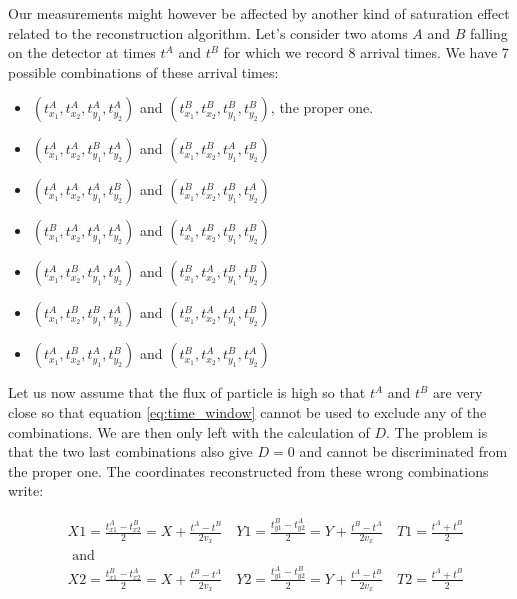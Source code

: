 Our measurements might however be affected by another kind of saturation effect related to the reconstruction algorithm. Let's consider two atoms $A$ and $B$ falling on the detector at times $t^A$ and $t^B$ for which we record 8 arrival times. We have 7 possible combinations of these arrival times:

\begin{itemize}
    \item $(t^A_{x_1},t^A_{x_2},t^A_{y_1},t^A_{y_2})$ and $(t^B_{x_1},t^B_{x_2},t^B_{y_1},t^B_{y_2})$, the proper one.
    
    \item $(t^A_{x_1},t^A_{x_2},t^B_{y_1},t^A_{y_2})$ and $(t^B_{x_1},t^B_{x_2},t^A_{y_1},t^B_{y_2})$
    
    \item $(t^A_{x_1},t^A_{x_2},t^A_{y_1},t^B_{y_2})$ and $(t^B_{x_1},t^B_{x_2},t^B_{y_1},t^A_{y_2})$
    
    \item $(t^B_{x_1},t^A_{x_2},t^A_{y_1},t^A_{y_2})$ and $(t^A_{x_1},t^B_{x_2},t^B_{y_1},t^B_{y_2})$
    
    \item $(t^A_{x_1},t^B_{x_2},t^A_{y_1},t^A_{y_2})$ and $(t^B_{x_1},t^A_{x_2},t^B_{y_1},t^B_{y_2})$
    
    \item $(t^A_{x_1},t^B_{x_2},t^B_{y_1},t^A_{y_2})$ and $(t^B_{x_1},t^A_{x_2},t^A_{y_1},t^B_{y_2})$
    
    \item $(t^A_{x_1},t^B_{x_2},t^A_{y_1},t^B_{y_2})$ and $(t^B_{x_1},t^A_{x_2},t^B_{y_1},t^A_{y_2})$
\end{itemize}

Let us now assume that the flux of particle is high so that $t^A$ and $t^B$ are very close so that equation \ref{eq:time_window} cannot be used to exclude any of the combinations. We are then only left with the calculation of $D$. The problem is that the two last combinations also give $D=0$ and cannot be discriminated from the proper one. The coordinates reconstructed from these wrong combinations write:

\begin{equation}
\begin{aligned}
&X 1=\frac{t_{x 1}^{A}-t_{x 2}^{B}}{2}=X+\frac{t^{A}-t^{B}}{2 v_{x}} \quad Y 1=\frac{t_{y 1}^{B}-t_{y 2}^{A}}{2}=Y+\frac{t^{B}-t^{A}}{2 v_{x}} \quad T 1=\frac{t^{A}+t^{B}}{2}\\
&\text { and }\\
&X 2=\frac{t_{x 1}^{B}-t_{x 2}^{A}}{2}=X+\frac{t^{B}-t^{A}}{2 v_{x}} \quad Y 2=\frac{t_{y 1}^{A}-t_{y 2}^{B}}{2}=Y+\frac{t^{A}-t^{B}}{2 v_{x}} \quad T 2=\frac{t^{A}+t^{B}}{2}
\end{aligned}
\end{equation}

